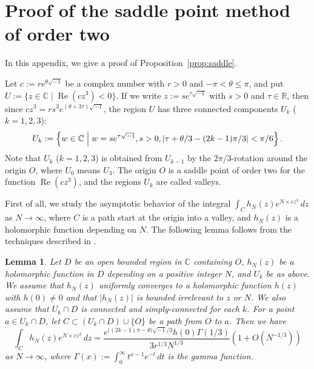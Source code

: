 \documentclass[a4paper,dvipdfmx]{amsart}
\theoremstyle{plain}
\newtheorem{lem}[thm]{Lemma}
\theoremstyle{definition}
\theoremstyle{remark}
\newcommand{\C}{\mathbb{C}}
\newcommand{\R}{\mathbb{R}}
\renewcommand{\Re}{\operatorname{Re}}
\renewcommand{\i}{\sqrt{-1}}
\numberwithin{equation}{section}
\begin{document}
\section{Proof of the saddle point method of order two}\label{sec:saddle_proof}
In this appendix, we give a proof of Proposition~\ref{prop:saddle}.
\par
Let $c:=re^{\theta\i}$ be a complex number with $r>0$ and $-\pi<\theta\le\pi$, and put $U:=\{z\in\C\mid\Re(cz^3)<0\}$.
If we write $z:=se^{\tau\i}$ with $s>0$ and $\tau\in\R$, then since $cz^3=rs^3e^{(\theta+3\tau)\i}$, the region $U$ has three connected components $U_{k}$ ($k=1,2,3$):
\begin{equation}\label{eq:valley}
  U_{k}
  :=
  \left\{
    w\in\C\Bigm|
    w=se^{\tau\i},
    s>0,
    \left|\tau+\theta/3-(2k-1)\pi/3\right|<\pi/6
  \right\}.
\end{equation}
Note that $U_{k}$ ($k=1,2,3$) is obtained from $U_{k-1}$ by the $2\pi/3$-rotation around the origin $O$, where $U_{0}$ means $U_{3}$.
The origin $O$ is a saddle point of order two for the function $\Re(cz^3)$, and the regions $U_{k}$ are called valleys.
\par
First of all, we study the asymptotic behavior of the integral $\int_{C}h_N(z)e^{N\times cz^3}\,dz$ as $N\to\infty$, where $C$ is a path start at the origin into a valley, and $h_N(z)$ is a holomorphic function depending on $N$.
The following lemma follows from the techniques described in \cite[II.4]{Wong:1989}.
\begin{lem}\label{lem:cz^3}
Let $D$ be an open bounded region in $\C$ containing $O$, $h_N(z)$ be a holomorphic function in $D$ depending on a positive integer $N$, and $U_{k}$ be as above.
We assume that $h_N(z)$ uniformly converges to a holomorphic function $h(z)$ with $h(0)\ne0$ and that $\left|h_N(z)\right|$ is bounded irrelevant to $z$ or $N$.
We also assume that $U_{k}\cap D$ is connected and simply-connected for each $k$.
For a point $a\in U_{k}\cap D$, let $C\subset(U_{k}\cap D)\cup\{O\}$ be a path from $O$ to $a$.
Then we have
\begin{equation*}
  \int_{C}h_N(z)e^{N\times cz^3}\,dz
  =
  \frac{e^{\bigl((2k-1)\pi-\theta\bigr)\i/3}h(0)\Gamma(1/3)}{3r^{1/3}N^{1/3}}
  \left(1+O(N^{-1/3})\right)
\end{equation*}
as $N\to\infty$, where $\Gamma(x):=\int_{0}^{\infty}t^{x-1}e^{-t}\,dt$ is the gamma function.
\end{lem}
\end{document}
